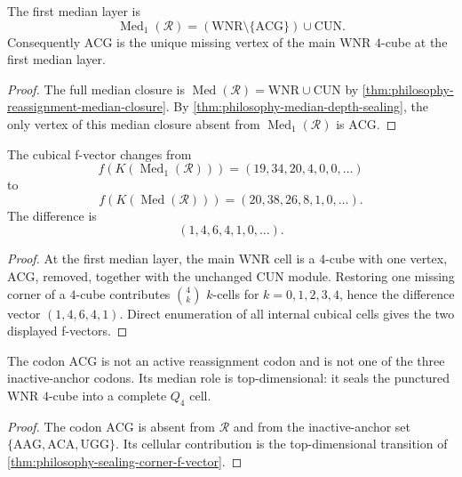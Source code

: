 \begin{theorem}
\label{thm:philosophy-punctured-median-q4}
The first median layer is
$$
  \operatorname{Med}_{1}(\mathcal{R})
  =
  (\mathrm{WNR}\setminus\{\mathrm{ACG}\})\cup\mathrm{CUN}.
$$
Consequently $\mathrm{ACG}$ is the unique missing vertex of the main
$\mathrm{WNR}$ $4$-cube at the first median layer.
\end{theorem}
\begin{proof}
The full median closure is
$\operatorname{Med}(\mathcal{R})=\mathrm{WNR}\cup\mathrm{CUN}$ by
\autoref{thm:philosophy-reassignment-median-closure}. By
\autoref{thm:philosophy-median-depth-sealing}, the only vertex of this
median closure absent from $\operatorname{Med}_{1}(\mathcal{R})$ is
$\mathrm{ACG}$.
\end{proof}

\begin{theorem}
\label{thm:philosophy-sealing-corner-f-vector}
The cubical f-vector changes from
$$
  f(K(\operatorname{Med}_{1}(\mathcal{R})))
  =
  (19,34,20,4,0,0,\ldots)
$$
to
$$
  f(K(\operatorname{Med}(\mathcal{R})))
  =
  (20,38,26,8,1,0,\ldots).
$$
The difference is
$$
  (1,4,6,4,1,0,\ldots).
$$
\end{theorem}
\begin{proof}
At the first median layer, the main $\mathrm{WNR}$ cell is a $4$-cube
with one vertex, $\mathrm{ACG}$, removed, together with the unchanged
CUN module. Restoring one missing corner of a $4$-cube contributes
$\binom{4}{k}$ $k$-cells for $k=0,1,2,3,4$, hence the difference vector
$(1,4,6,4,1)$. Direct enumeration of all internal cubical cells gives
the two displayed f-vectors.
\end{proof}

\begin{corollary}
\label{cor:philosophy-top-dimensional-sealing-corner}
The codon $\mathrm{ACG}$ is not an active reassignment codon and is not
one of the three inactive-anchor codons. Its median role is
top-dimensional: it seals the punctured $\mathrm{WNR}$ $4$-cube into a
complete $Q_{4}$ cell.
\end{corollary}
\begin{proof}
The codon $\mathrm{ACG}$ is absent from $\mathcal{R}$ and from the
inactive-anchor set $\{\mathrm{AAG},\mathrm{ACA},\mathrm{UGG}\}$. Its
cellular contribution is the top-dimensional transition of
\autoref{thm:philosophy-sealing-corner-f-vector}.
\end{proof}

